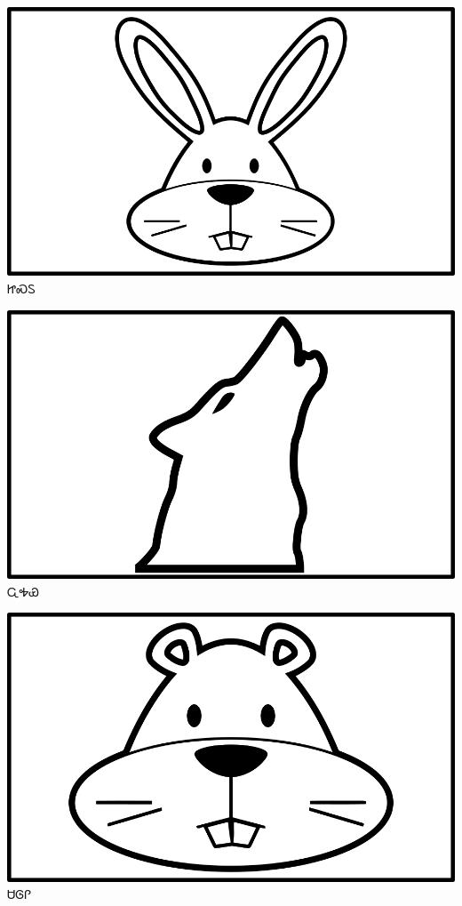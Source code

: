\documentclass[avery5371]{flashcards}%
\begin{document}
    \begin{flashcard}{
        \includegraphics[width=0.95\columnwidth,height=.51\columnwidth,keepaspectratio]{../artwork/objects-animate/jisdu}
    }
        \Huge ᏥᏍᏚ
    \end{flashcard}
    \begin{flashcard}{
        \includegraphics[width=0.95\columnwidth,height=.51\columnwidth,keepaspectratio]{../artwork/objects-animate/wahya}
    }
        \Huge ᏩᎭᏯ
    \end{flashcard}

    \begin{flashcard}{
        \includegraphics[width=0.95\columnwidth,height=.51\columnwidth,keepaspectratio]{../artwork/objects-animate/saloli}
    }
        \Huge ᏌᎶᎵ
    \end{flashcard}
\end{document}
